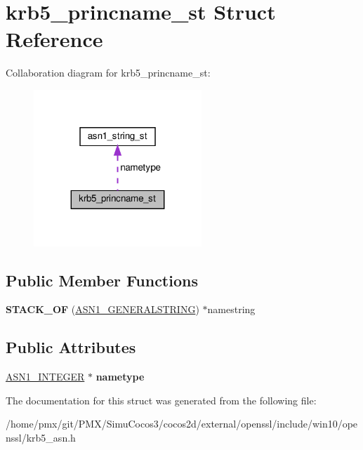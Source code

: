 \hypertarget{structkrb5__princname__st}{}\section{krb5\+\_\+princname\+\_\+st Struct Reference}
\label{structkrb5__princname__st}


Collaboration diagram for krb5\+\_\+princname\+\_\+st\+:
\nopagebreak
\begin{figure}[H]
\begin{center}
\leavevmode
\includegraphics[width=179pt]{structkrb5__princname__st__coll__graph}
\end{center}
\end{figure}
\subsection*{Public Member Functions}
\begin{DoxyCompactItemize}
\item 
\mbox{\label{structkrb5__princname__st_a8222c7dfd592bb047cd38b1e22ff2812}} 
{\bfseries S\+T\+A\+C\+K\+\_\+\+OF} (\hyperlink{structasn1__string__st}{A\+S\+N1\+\_\+\+G\+E\+N\+E\+R\+A\+L\+S\+T\+R\+I\+NG}) $\ast$namestring
\end{DoxyCompactItemize}
\subsection*{Public Attributes}
\begin{DoxyCompactItemize}
\item 
\mbox{\label{structkrb5__princname__st_a0cc37375579e858fd5956ec1d824a8c2}} 
\hyperlink{structasn1__string__st}{A\+S\+N1\+\_\+\+I\+N\+T\+E\+G\+ER} $\ast$ {\bfseries nametype}
\end{DoxyCompactItemize}


The documentation for this struct was generated from the following file\+:\begin{DoxyCompactItemize}
\item 
/home/pmx/git/\+P\+M\+X/\+Simu\+Cocos3/cocos2d/external/openssl/include/win10/openssl/krb5\+\_\+asn.\+h\end{DoxyCompactItemize}

